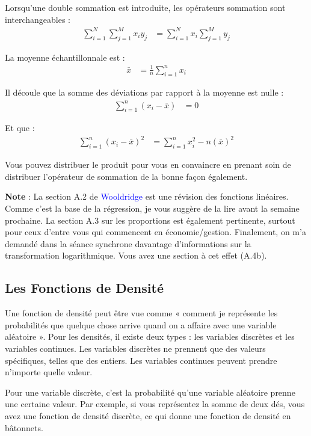 \documentclass[14pt]{extarticle} %
\newcommand{\livre}[1]{\textcolor{blue}{#1}}
\begin{document}
Lorsqu’une double sommation est introduite, les opérateurs sommation sont interchangeables :
\begin{align*}
    \sum_{i=1}^{N} \sum_{j=1}^{M} x_i y_j &= \sum_{i=1}^{N} x_i \sum_{j=1}^{M} y_j
\end{align*}

La moyenne échantillonnale est :
\begin{align*}
    \bar{x} &= \frac{1}{n} \sum_{i=1}^{n} x_i
\end{align*}

Il découle que la somme des déviations par rapport à la moyenne est nulle :
\begin{align*}
    \sum_{i=1}^{n} (x_i - \bar{x}) &= 0
\end{align*}

Et que :
\begin{align*}
    \sum_{i=1}^{n} (x_i - \bar{x})^2 &= \sum_{i=1}^{n} x_i^2 - n(\bar{x})^2
\end{align*}

Vous pouvez distribuer le produit pour vous en convaincre en prenant soin de distribuer 
l’opérateur de sommation de la bonne façon également.

\textbf{Note} : La section A.2 de \livre{Wooldridge} est une révision des fonctions linéaires. 
Comme c’est la base de la régression, je vous suggère de la lire avant la semaine prochaine. 
La section A.3 sur les proportions est également pertinente, surtout pour ceux d’entre vous 
qui commencent en économie/gestion. Finalement, on m’a demandé dans la séance synchrone 
davantage d’informations sur la transformation logarithmique. Vous avez une section à cet effet (A.4b).

\subsection{Les Fonctions de Densité}

Une fonction de densité peut être vue comme « comment je représente les probabilités que quelque 
chose arrive quand on a affaire avec une variable aléatoire ». Pour les densités, il existe deux 
types : les variables discrètes et les variables continues. Les variables discrètes ne prennent que 
des valeurs spécifiques, telles que des entiers. Les variables continues peuvent prendre n’importe 
quelle valeur.

Pour une variable discrète, c’est la probabilité qu’une variable aléatoire prenne une certaine valeur. 
Par exemple, si vous représentez la somme de deux dés, vous avez une fonction de densité discrète, 
ce qui donne une fonction de densité en bâtonnets.
\end{document}

